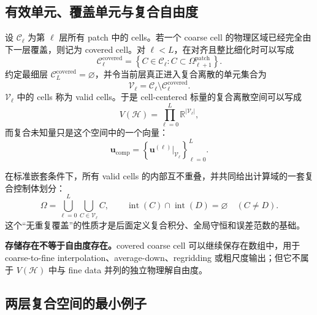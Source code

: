 \subsection{有效单元、覆盖单元与复合自由度}

设 $\mathcal C_\ell$ 为第 $\ell$ 层所有 patch 中的 cells。若一个 coarse cell 的物理区域已经完全由下一层覆盖，则记为 covered cell。对 $\ell<L$，在对齐且整比细化时可以写成
\begin{equation}
\mathcal C_\ell^{\mathrm{covered}}
=
\left\{
C\in\mathcal C_\ell:
C\subset\Omega_{\ell+1}^{\mathrm{patch}}
\right\}.
\end{equation}
约定最细层 $\mathcal C_L^{\mathrm{covered}}=\varnothing$，并令当前层真正进入复合离散的单元集合为
\begin{equation}
\boxed{
\mathcal V_\ell
=
\mathcal C_\ell\setminus
\mathcal C_\ell^{\mathrm{covered}}.
}
\label{eq:amr-valid-set}
\end{equation}
$\mathcal V_\ell$ 中的 cells 称为 valid cells。于是 cell-centered 标量的复合离散空间可以写成
\begin{equation}
\boxed{
V(\mathcal H)
=
\prod_{\ell=0}^{L}
\mathbb R^{|\mathcal V_\ell|},
}
\label{eq:amr-composite-space}
\end{equation}
而复合未知量只是这个空间中的一个向量：
\begin{equation}
\bm u_{\mathrm{comp}}
=
\left\{
\bm u^{(\ell)}|_{\mathcal V_\ell}
\right\}_{\ell=0}^{L}.
\label{eq:amr_valid_unknowns}
\end{equation}

在标准嵌套条件下，所有 valid cells 的内部互不重叠，并共同给出计算域的一套复合控制体划分：
\begin{equation}
\Omega
=
\bigcup_{\ell=0}^{L}
\bigcup_{C\in\mathcal V_\ell}C,
\qquad
\operatorname{int}(C)\cap\operatorname{int}(D)=\varnothing
\quad(C\neq D).
\label{eq:amr-composite-partition}
\end{equation}
这个“无重复覆盖”的性质才是后面定义复合积分、全局守恒和误差范数的基础。

\begin{warningbox}
\textbf{存储存在不等于自由度存在。}covered coarse cell 可以继续保存在数组中，用于 coarse-to-fine interpolation、average-down、regridding 或粗尺度输出；但它不属于 $V(\mathcal H)$ 中与 fine data 并列的独立物理解自由度。
\end{warningbox}

\subsection{两层复合空间的最小例子}

